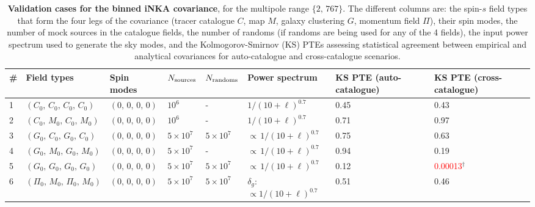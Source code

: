 \documentclass[%
 reprint,
superscriptaddress,
nofootinbib,
 amsmath,amssymb,
 aps,
 prd,
]{revtex4-2}
\begin{document}
    \begin{table}[t]
    \caption{\textbf{Validation cases for the binned iNKA covariance}, for the multipole range $\{2,\, 767\}$. The different columns are: the spin-$s$ field types that form the four legs of the covariance (tracer catalogue $C$, map $M$, galaxy clustering $G$, momentum field $\Pi$), their spin modes, the number of mock sources in the catalogue fields, the number of randoms (if randoms are being used for any of the 4 fields), the input power spectrum used to generate the sky modes, and the Kolmogorov-Smirnov (KS) PTEs assessing statistical agreement between empirical and analytical covariances for auto-catalogue and cross-catalogue scenarios.}
    \centering
    \scriptsize
    \setlength{\tabcolsep}{3pt}
    \renewcommand{\arraystretch}{1.12}
    \begin{tabular}{@{} l l l l l l p{} p{}@{}}
    \toprule
    \# &
    Field types
    & Spin modes
    & $N_{\rm sources}$
    & $N_{\rm randoms}$
    & Power spectrum
    & KS PTE (auto-catalogue)
    & KS PTE (cross-catalogue)\\
    \midrule

    1 &
    $(C_0,\,C_0,\, C_0,\, C_0)$
    & $(0,\, 0,\, 0,\, 0)$
    & $10^6$
    & -
    & $1/(10+\ell)^{0.7}$
    & 0.45 & 0.43 \\

    2 &
    $(C_0,\,M_0,\, C_0,\, M_0)$
    & $(0,\, 0,\, 0,\, 0)$
    & $10^6$
    & -
    & $1/(10+\ell)^{0.7}$
    & 0.71 & 0.97 \\

    3 &
    $(G_0,\,C_0,\, G_0,\, C_0)$
    & $(0,\, 0,\, 0,\, 0)$
    & $5\times 10^7$
    & $5\times 10^7$
    & $\propto\, 1/(10+\ell)^{0.7}$
    & 0.75 & 0.63\\

    4 &
    $(G_0,\,M_0,\, G_0,\, M_0)$
    & $(0,\, 0,\, 0,\, 0)$
    & $5\times10^7$
    & -
    & $\propto\, 1/(10+\ell)^{0.7}$
    & 0.94 & 0.19 \\

    5 &
    $(G_0,\,G_0,\, G_0,\, G_0)$
    & $(0,\,0,\, 0,\, 0)$
    & $5\times 10^7$
    & $5\times 10^7$
    & $\propto\, 1/(10+\ell)^{0.7}$  %
    & 0.12 & \textcolor{red}{0.00013}$^\dagger$\\

    6 &
    $(\Pi_0,\,M_0,\, \Pi_0,\, M_0)$
    & $(0,\,0,\, 0,\, 0)$
    & $5\times 10^7$
    & $5\times 10^7$
    & $\delta_g$: $\propto 1/(10+\ell)^{0.7}$ %
    & 0.51 & 0.46 \\


\end{tabular}
\end{table}
\end{document}
